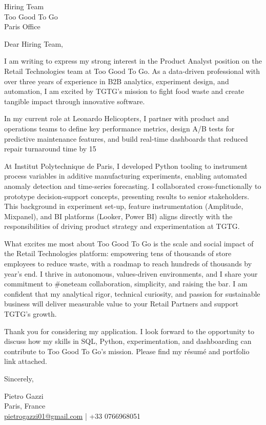 \documentclass[a4paper,10pt]{letter}
\begin{document}
\begin{letter}{Hiring Team \\
Too Good To Go \\
Paris Office}

\opening{Dear Hiring Team,}

I am writing to express my strong interest in the Product Analyst position on the Retail Technologies team at Too Good To Go. As a data-driven professional with over three years of experience in B2B analytics, experiment design, and automation, I am excited by TGTG’s mission to fight food waste and create tangible impact through innovative software.

In my current role at Leonardo Helicopters, I partner with product and operations teams to define key performance metrics, design A/B tests for predictive maintenance features, and build real-time dashboards that reduced repair turnaround time by 15%

At Institut Polytechnique de Paris, I developed Python tooling to instrument process variables in additive manufacturing experiments, enabling automated anomaly detection and time-series forecasting. I collaborated cross-functionally to prototype decision‑support concepts, presenting results to senior stakeholders. This background in experiment set-up, feature instrumentation (Amplitude, Mixpanel), and BI platforms (Looker, Power BI) aligns directly with the responsibilities of driving product strategy and experimentation at TGTG.

What excites me most about Too Good To Go is the scale and social impact of the Retail Technologies platform: empowering tens of thousands of store employees to reduce waste, with a roadmap to reach hundreds of thousands by year’s end. I thrive in autonomous, values-driven environments, and I share your commitment to #oneteam collaboration, simplicity, and raising the bar. I am confident that my analytical rigor, technical curiosity, and passion for sustainable business will deliver measurable value to your Retail Partners and support TGTG’s growth.

Thank you for considering my application. I look forward to the opportunity to discuss how my skills in SQL, Python, experimentation, and dashboarding can contribute to Too Good To Go’s mission. Please find my résumé and portfolio link attached.

\closing{Sincerely,}

Pietro Gazzi\\
Paris, France\\
\href{mailto:pietrogazzi01@gmail.com}{pietrogazzi01@gmail.com} | +33 0766968051

\end{letter}
\end{document}
